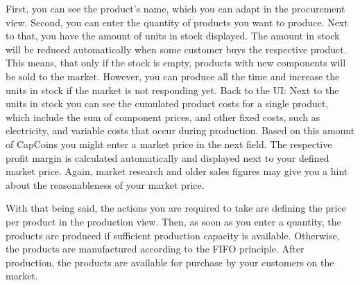 \documentclass[11pt,titlepage,oneside,openany]{book}
\begin{document}
First, you can see the product’s name, which you can adapt in the procurement view. Second, you can enter the quantity of products you want to produce. Next to that, you have the amount of units in stock displayed. The amount in stock will be reduced automatically when some customer buys the respective product. This means, that only if the stock is empty, products with new components will be sold to the market. However, you can produce all the time and increase the units in stock if the market is not responding yet.
Back to the UI: Next to the units in stock you can see the cumulated product costs for a single product, which include the sum of component prices, and other fixed costs, such as electricity, and variable costs that occur during production. Based on this amount of CapCoins you might enter a market price in the next field. The respective profit margin is calculated automatically and displayed next to your defined market price. Again, market research and older sales figures may give you a hint about the reasonableness of your market price.

With that being said, the actions you are required to take are defining the price per product in the production view. Then, as soon as you enter a quantity, the products are produced if sufficient production capacity is available. Otherwise, the products are manufactured according to the FIFO principle. After production, the products are available for purchase by your customers on the market.
\end{document}
